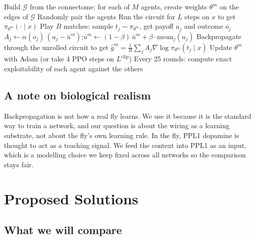 \documentclass{article}
\newcommand{\G}{\mathcal{G}}
\begin{document}
\begin{algorithm}[t]
\caption{Sampled self-play with circuit-wired agents}
\label{alg:train}
\begin{algorithmic}[1]
\State Build $\G$ from the connectome; for each of $M$ agents, create weights $\theta^m$ on the edges of $\G$
  \State Randomly pair the agents
    \State Run the circuit for $L$ steps on $x$ to get $\pi_{\theta^m}(\cdot \mid x)$ 
    \State Play $B$ matches: sample $t_j \sim \pi_{\theta^m}$, get payoff $u_j$ and outcome $o_j$ 
    \State $A_j \gets \alpha(o_j)\,(u_j - \bar u^m)$;\quad $\bar u^m \gets (1-\beta)\,\bar u^m + \beta \cdot \mathrm{mean}_j(u_j)$
    \State Backpropagate through the unrolled circuit to get $\hat g^m = \frac1B \sum_j A_j \nabla \log \pi_{\theta^m}(t_j \mid x)$ 
    \State Update $\theta^m$ with Adam (or take 4 PPO steps on $L^{\mathrm{clip}}$)
  \EndFor
  \State Every 25 rounds: compute exact exploitability of each agent against the others
\EndFor
\end{algorithmic}
\end{algorithm}

\subsection{A note on biological realism}

Backpropagation is not how a real fly learns. We use it because it is the standard way to train a network, and our question is about the wiring as a learning substrate, not about the fly's own learning rule. In the fly, PPL1 dopamine is thought to act as a teaching signal. We feed the context into PPL1 as an input, which is a modelling choice we keep fixed across all networks so the comparison stays fair.

\section{Proposed Solutions}
\label{sec:solutions}

\subsection{What we will compare}
\end{document}
